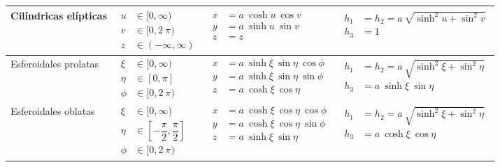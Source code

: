 \documentclass[12pt,landscape]{article}
\numberwithin{equation}{section}
\begin{document}
{\begin{longtable}{| l | p{5cm} | l | p{7.3cm} |}
Cilíndricas elípticas & $\!\begin{aligned}
u &\in [0,\infty) \\
v &\in [0, 2 \: \pi) \\
z &\in (-\infty, \infty)
\end{aligned}$ & $\!\begin{aligned}
x &= a \: \cosh u \: \cos v \\
y &= a \: \sinh u \: \sin v \\
z &= z
\end{aligned}$ & $\!\begin{aligned}
h_{1 }&= h_{2} = a \: \sqrt{\sinh^{2 }u + \sin^{2 }v} \\
h_{3} &= 1
\end{aligned}$ \\ \hline

Esferoidales prolatas & $\!\begin{aligned}
\xi &\in [0, \infty) \\
\eta &\in [0, \pi] \\
\phi &\in [0, 2 \: \pi)
\end{aligned}$ & $\!\begin{aligned}
x &= a \: \sinh \xi \: \sin \eta \: \cos \phi\\
y &= a \: \sinh \xi \: \sin \eta \: \sin \phi\\
z &= a \: \cosh \xi \: \cos \eta
\end{aligned}$ & $\!\begin{aligned}
h_{1} &= h_{2} = a \: \sqrt{\sinh^{2} \xi + \sin^{2} \eta} \\
h_{3 }&= a \: \sinh \xi \: \sin \eta
\end{aligned}$ \\ \hline

Esferoidales oblatas & $\!\begin{aligned}
\xi &\in [0, \infty) \\
\eta &\in \left[- \dfrac{\pi}{2}, \dfrac{\pi}{2} \right] \\
\phi &\in [0, 2\: \pi)
\end{aligned}$ & $\!\begin{aligned}
x &= a \: \cosh \xi \: \cos \eta \: \cos \phi \\
y &= a \: \cosh \xi \: \cos \eta \: \sin \phi\\
z &= a \: \sinh \xi \: \sin \eta
\end{aligned}$ & $\!\begin{aligned}
h_{1 }&= h_{2} = a \: \sqrt{\sinh^{2} \xi + \sin^{2} \eta} \\
h_{3 }&= a \: \cosh \xi \: \cos \eta
\end{aligned}$ \\ \hline


\end{longtable}}
\end{document}
